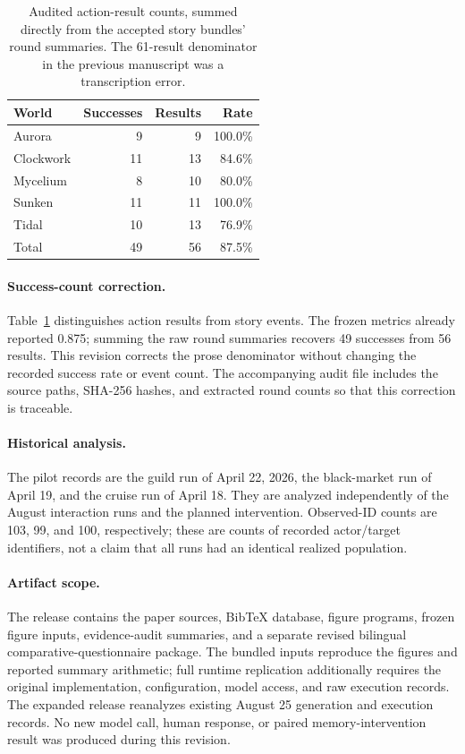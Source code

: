 \begin{table}[t]
\centering\small
\begin{tabular}{@{}lrrr@{}}
\toprule
World & Successes & Results & Rate \\
\midrule
Aurora & 9 & 9 & 100.0\% \\
Clockwork & 11 & 13 & 84.6\% \\
Mycelium & 8 & 10 & 80.0\% \\
Sunken & 11 & 11 & 100.0\% \\
Tidal & 10 & 13 & 76.9\% \\
\midrule
Total & 49 & 56 & 87.5\% \\
\bottomrule
\end{tabular}
\caption{Audited action-result counts, summed directly from the accepted
story bundles' round summaries. The 61-result denominator in the previous
manuscript was a transcription error.}
\label{tab:result-audit}
\end{table}

\paragraph{Success-count correction.}
Table~\ref{tab:result-audit} distinguishes action results from story events.
The frozen metrics already reported 0.875; summing the raw round summaries
recovers 49 successes from 56 results. This revision corrects the prose
denominator without changing the recorded success rate or event count.
The accompanying audit file includes the source paths, SHA-256 hashes, and
extracted round counts so that this correction is traceable.

\paragraph{Historical analysis.}
The pilot records are the guild run of April 22, 2026, the black-market run of
April 19, and the cruise run of April 18. They are analyzed independently of
the August interaction runs and the planned intervention. Observed-ID counts
are 103, 99, and 100, respectively; these are counts of recorded actor/target
identifiers, not a claim that all runs had an identical realized population.

\paragraph{Artifact scope.}
The release contains the paper sources, BibTeX database, figure programs,
frozen figure inputs, evidence-audit summaries, and a separate revised bilingual
comparative-questionnaire package. The bundled inputs reproduce the figures and reported
summary arithmetic; full runtime replication additionally requires the
original implementation, configuration, model access, and raw execution
records. The expanded release reanalyzes existing August 25 generation and execution
records. No new model call, human response, or paired memory-intervention
result was produced during this revision.
